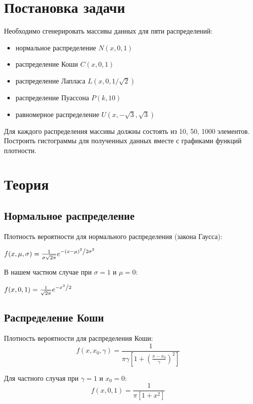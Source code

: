 \section{Постановка задачи}
Необходимо сгенерировать массивы данных для пяти распределений:
\begin{itemize}
\item нормальное распределение \( N(x, 0, 1) \)
\item распределение Коши \( C(x, 0, 1) \)
\item распределение Лапласа \( L(x, 0, 1/\sqrt{2}) \)
\item распределение Пуассона \( P(k, 10) \)
\item равномерное распределение \( U(x, -\sqrt{3}, \sqrt{3}) \)
\end{itemize}
Для каждого распределения массивы должны состоять из 10, 50, 1000 элементов. Построить гистограммы для полученных данных вместе с графиками функций плотности.



\section{Теория}
\subsection{Нормальное распределение}
Плотность вероятности для нормального распределения (закона Гаусса):

$
  f(x, \mu, \sigma) = \frac{1}{{\sigma \sqrt {2\pi } }}e^{{{ - \left( {x - \mu } \right)^2 } \mathord{\left/ {\vphantom {{ - \left( {x - \mu } \right)^2 } {2\sigma ^2 }}} \right. \kern-\nulldelimiterspace} {2\sigma ^2 }}}
$
 
В нашем частном случае при \( \sigma = 1 \) и \( \mu = 0 \):

$
  f(x, 0, 1) = \frac{1}{ \sqrt {2\pi } }e^{{{ -{x}^2 } \mathord{\left/ {\vphantom {{ -{x}^2 } {2\sigma ^2 }}} \right. \kern-\nulldelimiterspace} {2}}}
$


\subsection{Распределение Коши}
Плотность вероятности для распределения Коши:
$$
f(x, {x_0}, \gamma) =  \frac{1}{\pi\gamma \left[1 + \left(\frac{x-x_0}{\gamma}\right)^2\right]}
$$

Для частного случая при \( \gamma = 1 \) и \( x_0 = 0 \):
$$
f(x, 0, 1) =  \frac{1}{\pi \left[1 + {x}^2\right]}
$$


